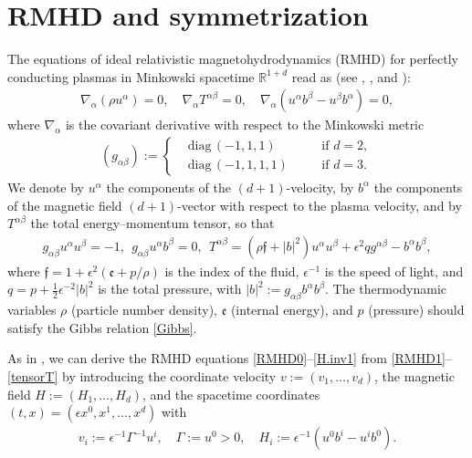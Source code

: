 \documentclass[twoside,11pt]{article}
\numberwithin{equation}{section}
\begin{document}
\section[RMHD and symmetrization]{RMHD and symmetrization} \label{app:A}
The equations of ideal relativistic magnetohydrodynamics (RMHD) for perfectly conducting plasmas in Minkowski spacetime $\mathbb{R}^{1+d}$ read as (see \cite[\S\S 30--34]{Lichnerowicz67}, \cite[Chapter 22]{GKP19}, and \cite[\S 2.4]{A90zbMATH05040442}):
\begin{align}\label{RMHD1}
	\nabla_{\alpha} (\rho u^{\alpha})=0,\quad
	\nabla_{\alpha}  T^{\alpha\beta}=0,\quad
	\nabla_{\alpha}(u^{\alpha}b^{\beta}-u^{\beta}b^{\alpha})=0,
\end{align}
where $\nabla_{\alpha}$ is the covariant derivative with respect to the Minkowski metric
\begin{align*}
	(g_{\alpha \beta}):=
	\left\{
	\begin{aligned}
		&\mathrm{diag}\,(-1,1,1)\quad &&\textrm{if } d=2,\\
		&\mathrm{diag}\,(-1,1,1,1)\quad &&\textrm{if }d=3.
	\end{aligned}
	\right.
\end{align*}
We denote by $u^{\alpha}$ the components of the $(d+1)$-velocity,
by $b^{\alpha}$ the components of the magnetic field $(d+1)$-vector with respect to the plasma velocity,
and by $T^{\alpha\beta}$ the total energy--momentum tensor,
so that
\begin{align}\label{tensorT}
	g_{\alpha \beta} u^{\alpha} u^{\beta}=-1,\ \
	g_{\alpha \beta} u^{\alpha} b^{\beta}=0,\ \
	T^{\alpha\beta}=(\rho \mathfrak{f}+|b|^2)u^{\alpha}u^{\beta}+\epsilon^2 q g^{\alpha\beta} -b^{\alpha}b^{\beta},
\end{align}
where $\mathfrak{f}=1+\epsilon^{2}(\mathfrak{e}+ p/\rho)$ is the index of the fluid,
$\epsilon^{-1}$ is the speed of light,
and $q=p+\frac{1}{2} \epsilon^{-2}|b|^2$ is the total pressure,
with $|b|^2:=g_{\alpha \beta} b^{\alpha} b^{\beta}$.
The thermodynamic variables $\rho$ (particle number density),
$\mathfrak{e}$ (internal energy), and $p$ (pressure) should satisfy
the Gibbs relation \eqref{Gibbs}.


As in \cite{TW21MR4201624,FT13MR3044369},
we can derive the RMHD equations \eqref{RMHD0}--\eqref{H.inv1} from \eqref{RMHD1}--\eqref{tensorT} by introducing the coordinate velocity $v:=(v_1,\ldots,v_d)$,
the magnetic field $H:=(H_1,\ldots,H_d)$, and
the spacetime coordinates $(t,x)=(\epsilon x^0, x^1,\ldots,x^d)$
with
\begin{align*}
	v_i:=\epsilon^{-1}\varGamma^{-1} u^{i},\quad
	\varGamma:=u^0>0,\quad
	H_i:=\epsilon^{-1}(u^0 b^i-u^i b^0).
\end{align*}
\end{document}
